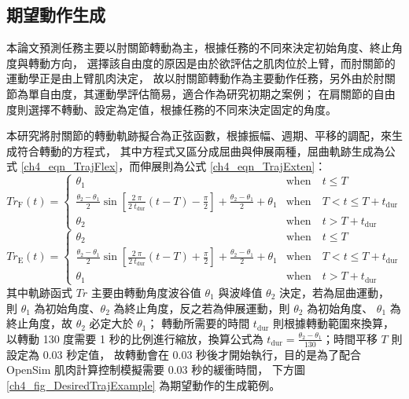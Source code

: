 \subsection{期望動作生成}
本論文預測任務主要以肘關節轉動為主，根據任務的不同來決定初始角度、終止角度與轉動方向，
選擇該自由度的原因是由於欲評估之肌肉位於上臂，而肘關節的運動學正是由上臂肌肉決定，
故以肘關節轉動作為主要動作任務，另外由於肘關節為單自由度，其運動學評估簡易，適合作為研究初期之案例；
在肩關節的自由度則選擇不轉動、設定為定值，根據任務的不同來決定固定的角度。

本研究將肘關節的轉動軌跡擬合為正弦函數，根據振幅、週期、平移的調配，來生成符合轉動的方程式，
其中方程式又區分成屈曲與伸展兩種，屈曲軌跡生成為公式 \ref{ch4_eqn_TrajFlex}，而伸展則為公式 \ref{ch4_eqn_TrajExten}：
\begin{equation}
    \mathit{Tr}_\mathrm{F}(t) =
    \begin{cases}
        \theta_1 & \text{when} \quad t \leq T \\
        \frac{\theta_2 - \theta_1}{2} \sin[\frac{2 \ \pi}{2 \ t_\mathrm{dur}} (t-T) - \frac{\pi}{2}]
         + \frac{\theta_2 - \theta_1}{2} + \theta_1 & \text{when} \quad T < t \leq T + t_\mathrm{dur} \\
        \theta_2 & \text{when} \quad t > T + t_\mathrm{dur}
    \end{cases}
    \label{ch4_eqn_TrajFlex}
\end{equation}
\begin{equation}
    \mathit{Tr}_\mathrm{E}(t) =
    \begin{cases}
        \theta_2  & \text{when} \quad t \leq T \\
        \frac{\theta_2 - \theta_1}{2} \sin[\frac{2 \ \pi}{2 \ t_\mathrm{dur}} (t-T) + \frac{\pi}{2}]
         + \frac{\theta_2 - \theta_1}{2} + \theta_1 & \text{when} \quad T < t \leq T + t_\mathrm{dur} \\
        \theta_1  & \text{when} \quad t > T + t_\mathrm{dur}
    \end{cases}
    \label{ch4_eqn_TrajExten}
\end{equation}
其中軌跡函式 $\mathit{Tr}$ 主要由轉動角度波谷值 $\theta_1$ 與波峰值 $\theta_2$ 決定，若為屈曲運動，
則 $\theta_1$ 為初始角度、$\theta_2$ 為終止角度，反之若為伸展運動，則 $\theta_2$ 為初始角度、
$\theta_1$ 為終止角度，故 $\theta_2$ 必定大於 $\theta_1$；
轉動所需要的時間 $t_\mathrm{dur}$ 則根據轉動範圍來換算，以轉動 130 度需要 1 秒的比例進行縮放，換算公式為
$t_\mathrm{dur} = \frac{\theta_2 - \theta_1}{130}$；時間平移 $T$ 則設定為 0.03 秒定值，
故轉動會在 0.03 秒後才開始執行，目的是為了配合 OpenSim 肌肉計算控制模擬需要 0.03 秒的緩衝時間，
下方圖 \ref{ch4_fig_DesiredTrajExample} 為期望動作的生成範例。

